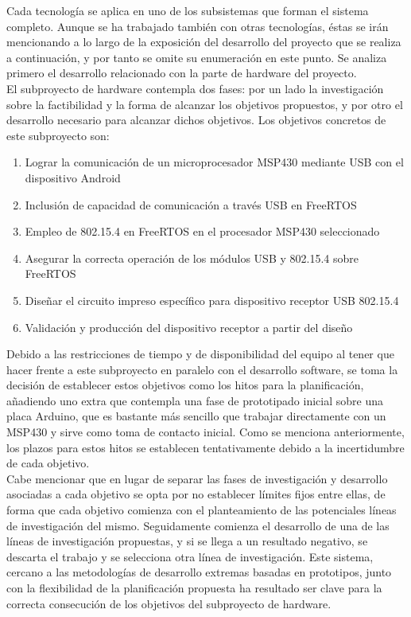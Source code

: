	Cada tecnología se aplica en uno de los subsistemas que forman el sistema completo. Aunque se ha trabajado también con otras tecnologías, éstas se irán mencionando a lo largo de la exposición del desarrollo del proyecto que se realiza a continuación, y por tanto se omite su enumeración en este punto. Se analiza primero el desarrollo relacionado con la parte de hardware del proyecto.\\

	El subproyecto de hardware contempla dos fases: por un lado la investigación sobre la factibilidad y la forma de alcanzar los objetivos propuestos, y por otro el desarrollo necesario para alcanzar dichos objetivos. Los objetivos concretos de este subproyecto son:

		\begin{enumerate}
			\item Lograr la comunicación de un microprocesador MSP430 mediante USB con el dispositivo Android
			\item Inclusión de capacidad de comunicación a través USB en FreeRTOS
			\item Empleo de 802.15.4 en FreeRTOS en el procesador MSP430 seleccionado
			\item Asegurar la correcta operación de los módulos USB y 802.15.4 sobre FreeRTOS
			\item Diseñar el circuito impreso específico para dispositivo receptor USB 802.15.4
			\item Validación y producción del dispositivo receptor a partir del diseño
		\end{enumerate}

	Debido a las restricciones de tiempo y de disponibilidad del equipo al tener que hacer frente a este subproyecto en paralelo con el desarrollo software, se toma la decisión de establecer estos objetivos como los hitos para la planificación, añadiendo uno extra que contempla una fase de  prototipado inicial sobre una placa Arduino, que es bastante más sencillo que trabajar directamente con un MSP430 y sirve como toma de contacto inicial. Como se menciona anteriormente, los plazos para estos hitos se establecen tentativamente debido a la incertidumbre de cada objetivo.\\

	Cabe mencionar que en lugar de separar las fases de investigación y desarrollo asociadas a cada objetivo se opta por no establecer límites fijos entre ellas, de forma que cada objetivo comienza con el planteamiento de las potenciales líneas de investigación del mismo. Seguidamente comienza el desarrollo de una de las líneas de investigación propuestas, y si se llega a un resultado negativo, se descarta el trabajo y se selecciona otra línea de investigación. Este sistema, cercano a las metodologías de desarrollo extremas basadas en prototipos, junto con la flexibilidad de la planificación propuesta ha resultado ser clave para la correcta consecución de los objetivos del subproyecto de hardware.\\

